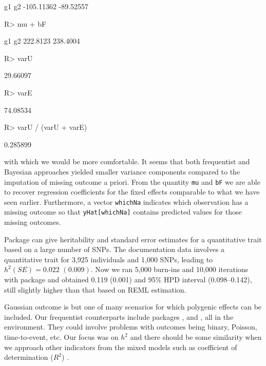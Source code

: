 \documentclass[article]{jss}
\begin{document}
\begin{Schunk}
\begin{Soutput}
        g1         g2 
-105.11362  -89.52557 
\end{Soutput}
\begin{Sinput}
R> mu + bF
\end{Sinput}
\begin{Soutput}
      g1       g2 
222.8123 238.4004 
\end{Soutput}
\begin{Sinput}
R> varU
\end{Sinput}
\begin{Soutput}
         [,1]
[1,] 29.66097
\end{Soutput}
\begin{Sinput}
R> varE
\end{Sinput}
\begin{Soutput}
[1] 74.08534
\end{Soutput}
\begin{Sinput}
R> varU / (varU + varE)
\end{Sinput}
\begin{Soutput}
         [,1]
[1,] 0.285899
\end{Soutput}
\end{Schunk}
%
with which we would be more comfortable. It seems that both frequentist
and Bayesian approaches yielded smaller variance components compared to
the imputation of missing outcome a priori. From the quantity \texttt{mu}
and \texttt{bF} we are able to recover regression coefficients for the
fixed effects comparable to what we have seen earlier. Furthermore, a
vector \texttt{whichNa} indicates which observation has a missing outcome
so that \texttt{yHat[whichNa]} contains predicted values for those missing
outcomes.

Package  can give heritability and standard error estimates
for a quantitative trait based on a large number of SNPs. The
documentation data involves a quantitative trait for 3,925 individuals
and 1,000 SNPs, leading to $h^2 (\mathit{SE})=0.022$ $(0.009)$. 
Now we ran 5,000 burn-ins and 10,000 iterations with package  
and obtained 0.119 (0.001) and 95\% HPD interval (0.098--0.142), still 
slightly higher than that based on REML estimation.

Gaussian outcome is but one of many scenarios for which polygenic effects 
can be included. Our frequentist counterparts include packages ,
 \citep{vazquez10} and  \citep{coxme}, all 
in the  environment. They could involve problems with outcomes 
being binary, Poisson, time-to-event, etc. Our focus was on $h^2$ and 
there should be some similarity when we approach other indicators from the 
mixed models such as coefficient of determination ($R^2$) 
\citep{nakagawa13}.
\end{document}
